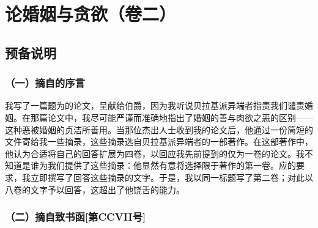 \section{论婚姻与贪欲（卷二）}


\subsection{预备说明}


\subsubsection{（一）摘自的序言}

我写了一篇题为的论文，呈献给伯爵，因为我听说贝拉基派异端者指责我们谴责婚姻。在那篇论文中，我尽可能严谨而准确地指出了婚姻的善与肉欲之恶的区别——这种恶被婚姻的贞洁所善用。当那位杰出人士收到我的论文后，他通过一份简短的文件寄给我一些摘录，这些摘录选自贝拉基派异端者的一部著作。在这部著作中，他认为合适将自己的回答扩展为四卷，以回应我先前提到的仅为一卷的论文。我不知道是谁为我们提供了这些摘录：他显然有意将选择限于著作的第一卷。应的要求，我立即撰写了回答这些摘录的文字。于是，我以同一标题写了第二卷；对此以八卷的文字予以回答，这超出了他饶舌的能力。\par


\subsubsection{（二）摘自致书函[第CCVII号]}

\par


